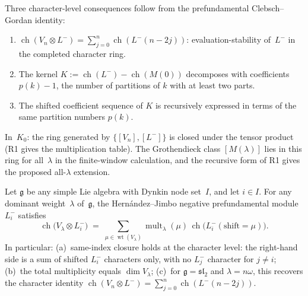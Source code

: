 \begin{computation}
Three character-level consequences follow from the prefundamental
Clebsch--Gordan identity:
\begin{enumerate}[label=\textup{(R\arabic*)},nosep]
\item \(\operatorname{ch}(V_n \otimes L^-)
 = \sum_{j=0}^{n}\operatorname{ch}(L^-(n-2j))\):
 evaluation-stability of~$L^-$ in the completed character ring.
\item The kernel $K := \operatorname{ch}(L^-) - \operatorname{ch}(M(0))$
 decomposes with coefficients $p(k)-1$, the number of partitions of
 \(k\) with at least two parts.
\item The shifted coefficient sequence of \(K\) is recursively expressed
 in terms of the same partition numbers \(p(k)\).
\end{enumerate}
In~$K_0$: the ring generated by $\{[V_n], [L^-]\}$ is closed
under the tensor product (R1 gives the multiplication table).
The Grothendieck class $[M(\lambda)]$ lies in this ring
for all~$\lambda$ in the finite-window calculation, and the recursive
form of R1 gives the proposed all-\(\lambda\) extension.
\end{computation}

\begin{proposition}
\label{prop:prefundamental-clebsch-gordan}%
%
%
%
Let\/ $\mathfrak{g}$ be any simple Lie algebra with Dynkin
node set~$I$, and let\/ $i \in I$. For any dominant
weight~$\lambda$ of~$\mathfrak{g}$, the Hern\'andez--Jimbo
negative prefundamental module $L^-_i$ satisfies
\begin{equation}\label{eq:prefundamental-cg}
 \operatorname{ch}\bigl(V_\lambda \otimes L^-_i\bigr)
 \;=\;
 \sum_{\mu \in \operatorname{wt}(V_\lambda)}
 \operatorname{mult}_\lambda(\mu)\,
 \operatorname{ch}\bigl(L^-_i(\mathrm{shift} = \mu)\bigr).
\end{equation}
In particular: \textup{(a)}~same-index closure holds at the character
level: the right-hand side is a sum of shifted $L^-_i$ characters only,
with no $L^-_j$ character for $j \neq i$;
\textup{(b)}~the total multiplicity equals $\dim V_\lambda$;
\textup{(c)}~for $\mathfrak{g} = \mathfrak{sl}_2$ and
$\lambda = n\omega$, this recovers the character identity
\(\operatorname{ch}(V_n\otimes L^-)
=\sum_{j=0}^{n}\operatorname{ch}(L^-(n{-}2j))\).
\end{proposition}


